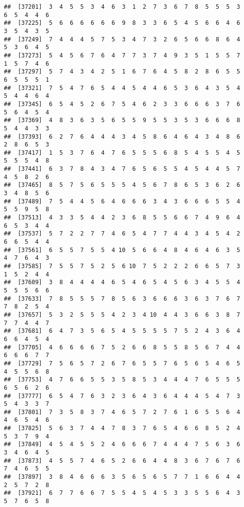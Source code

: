 \documentclass[
]{book}
\begin{document}
\begin{verbatim}
##  [37201]  3  4  5  5  3  4  6  3  1  2  7  3  6  7  8  5  5  5  3  6  5  4  4  6
##  [37225]  5  6  6  6  6  6  6  9  8  3  3  6  5  4  5  6  6  4  6  3  5  4  3  5
##  [37249]  7  4  4  4  5  7  5  3  4  7  3  2  6  5  6  6  8  6  4  5  3  6  4  5
##  [37273]  5  4  5  6  7  6  4  7  7  3  7  4  9  3  5  1  5  5  7  1  5  7  4  6
##  [37297]  5  7  4  3  4  2  5  1  6  7  6  4  5  8  2  8  6  5  5  6  5  5  5  1
##  [37321]  7  5  4  7  6  5  4  4  5  4  4  6  5  3  6  4  3  5  4  5  4  4  6  4
##  [37345]  6  5  4  5  2  6  7  5  4  6  2  3  3  6  6  6  3  7  6  5  6  4  5  4
##  [37369]  4  8  3  6  3  5  6  5  5  9  5  5  3  5  3  6  6  6  8  5  4  4  3  3
##  [37393]  6  2  7  6  4  4  4  3  4  5  8  6  4  6  4  3  4  8  6  2  8  6  5  3
##  [37417]  1  5  3  7  6  4  7  6  5  5  5  6  8  5  4  5  5  4  5  5  5  5  4  8
##  [37441]  6  3  7  8  4  3  4  7  6  5  6  5  5  4  5  4  4  5  7  4  5  8  2  6
##  [37465]  8  5  7  5  6  5  5  5  4  5  6  7  8  6  5  3  6  2  6  3  4  8  5  6
##  [37489]  7  5  4  4  5  6  4  6  6  6  3  4  3  6  6  6  5  5  4  5  5  9  5  8
##  [37513]  4  3  3  5  4  4  2  3  6  8  5  5  6  6  7  4  9  6  4  6  5  3  4  4
##  [37537]  5  7  2  2  7  7  4  6  5  4  7  7  4  4  3  4  5  4  2  6  6  5  4  4
##  [37561]  6  5  5  7  5  5  4 10  5  6  6  4  8  4  6  4  6  3  5  4  7  6  4  3
##  [37585]  7  5  5  7  5  2  5  6 10  7  5  2  2  2  6  6  5  7  3  1  5  2  4  4
##  [37609]  3  8  4  4  4  4  6  5  4  6  5  4  5  6  3  4  5  5  4  5  5  5  6  6
##  [37633]  7  8  5  5  5  7  8  5  6  3  6  6  6  3  6  3  7  6  7  7  8  2  5  4
##  [37657]  5  3  2  5  5  5  4  2  3  4 10  4  4  3  6  6  3  8  7  7  7  4  4  7
##  [37681]  6  4  7  3  5  6  5  4  5  5  5  5  7  5  2  4  3  6  4  6  6  4  5  4
##  [37705]  4  6  6  6  6  7  5  2  6  6  8  5  5  8  5  6  7  4  4  6  6  6  7  7
##  [37729]  7  5  6  5  7  2  6  7  6  5  5  7  6  5  6  5  4  6  5  4  5  5  6  8
##  [37753]  4  7  6  6  5  5  3  5  8  5  3  4  4  4  7  6  5  5  5  6  5  6  2  6
##  [37777]  6  5  4  7  6  3  2  3  6  4  3  6  4  4  4  5  4  7  3  5  4  3  3  7
##  [37801]  7  3  5  8  3  7  4  6  5  7  2  7  6  1  6  5  5  6  4  4  6  5  4  6
##  [37825]  5  6  3  7  4  4  7  8  3  7  6  5  4  6  6  8  5  2  4  5  3  7  9  4
##  [37849]  4  5  4  5  5  2  4  6  6  6  7  4  4  4  7  5  6  3  6  3  4  6  4  5
##  [37873]  4  5  5  7  4  6  5  2  6  6  4  4  8  3  6  7  6  7  6  7  4  6  5  5
##  [37897]  3  8  4  6  6  6  3  5  6  5  6  5  7  7  1  6  6  4  4  2  5  7  2  8
##  [37921]  6  7  7  6  6  7  5  5  4  5  4  5  3  3  5  5  6  4  3  5  7  6  5  8

\end{verbatim}
\end{document}
